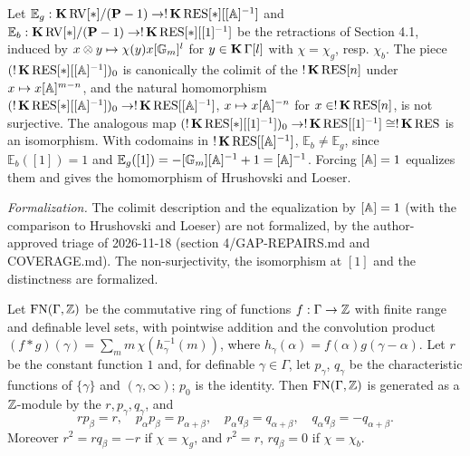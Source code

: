 \setcounter{theorem}{3}
\begin{remark}
\label{eb-no-eg}
\leanok
{}
Let $\mathbb{E}_g : \operatorname{\mathbf{K}} \mathrm{RV}[*] / (\mathbf{P} - 1) \to !\operatorname{\mathbf{K}} \mathrm{RES}[*][[\mathbb{A}]^{-1}]$ and $\mathbb{E}_b : \operatorname{\mathbf{K}} \mathrm{RV}[*] / (\mathbf{P} - 1) \to !\operatorname{\mathbf{K}} \mathrm{RES}[*][[1]^{-1}]$ be the retractions of Section 4.1, induced by $x \otimes y \mapsto \chi(y) x [\mathbb{G}_m]^l$ for $y \in \operatorname{\mathbf{K}} \Gamma[l]$ with $\chi = \chi_g$, resp. $\chi_b$. The piece $(!\operatorname{\mathbf{K}} \mathrm{RES}[*][[\mathbb{A}]^{-1}])_0$ is canonically the colimit of the $!\operatorname{\mathbf{K}} \mathrm{RES}[n]$ under $x \mapsto x[\mathbb{A}]^{m-n}$, and the natural homomorphism $(!\operatorname{\mathbf{K}} \mathrm{RES}[*][[\mathbb{A}]^{-1}])_0 \to !\operatorname{\mathbf{K}} \mathrm{RES}[[\mathbb{A}]^{-1}]$, $x \mapsto x[\mathbb{A}]^{-n}$ for $x \in !\operatorname{\mathbf{K}} \mathrm{RES}[n]$, is not surjective. The analogous map $(!\operatorname{\mathbf{K}} \mathrm{RES}[*][[1]^{-1}])_0 \to !\operatorname{\mathbf{K}} \mathrm{RES}[[1]^{-1}] \cong !\operatorname{\mathbf{K}} \mathrm{RES}$ is an isomorphism. With codomains in $!\operatorname{\mathbf{K}} \mathrm{RES}[[\mathbb{A}]^{-1}]$, $\mathbb{E}_b \neq \mathbb{E}_g$, since $\mathbb{E}_b([1]) = 1$ and $\mathbb{E}_g([1]) = -[\mathbb{G}_m][\mathbb{A}]^{-1} + 1 = [\mathbb{A}]^{-1}$. Forcing $[\mathbb{A}] = 1$ equalizes them and gives the homomorphism of Hrushovski and Loeser.

\emph{Formalization.} The colimit description and the equalization by $[\mathbb{A}] = 1$ (with the comparison to Hrushovski and Loeser) are not formalized, by the author-approved triage of 2026-11-18 (section 4/GAP-REPAIRS.md and COVERAGE.md). The non-surjectivity, the isomorphism at $[1]$ and the distinctness are formalized.
\end{remark}

\setcounter{theorem}{4}
\begin{definition}
\label{gam-equ-cons}
\leanok
{}
Let $\operatorname{FN}(\Gamma, \mathbb{Z})$ be the commutative ring of functions $f : \Gamma \to \mathbb{Z}$ with finite range and definable level sets, with pointwise addition and the convolution product $(f * g)(\gamma) = \sum_m m\, \chi(h_\gamma^{-1}(m))$, where $h_\gamma(\alpha) = f(\alpha) g(\gamma - \alpha)$. Let $r$ be the constant function $1$ and, for definable $\gamma \in \Gamma$, let $p_\gamma$, $q_\gamma$ be the characteristic functions of $\{\gamma\}$ and $(\gamma, \infty)$; $p_0$ is the identity. Then $\operatorname{FN}(\Gamma, \mathbb{Z})$ is generated as a $\mathbb{Z}$-module by the $r, p_\gamma, q_\gamma$, and \[ r p_\beta = r, \quad p_\alpha p_\beta = p_{\alpha + \beta}, \quad p_\alpha q_\beta = q_{\alpha + \beta}, \quad q_\alpha q_\beta = -q_{\alpha + \beta}. \] Moreover $r^2 = r q_\beta = -r$ if $\chi = \chi_g$, and $r^2 = r$, $r q_\beta = 0$ if $\chi = \chi_b$.
\end{definition}

